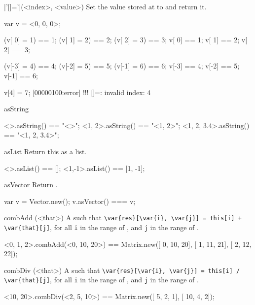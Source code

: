 \begin{urbiscriptapi}
\item|'[]='|(<index>, <value>)%
  Set the value stored at  to  and return it.
\begin{urbiassert}
var v = <0, 0, 0>;

(v[ 0] = 1) == 1; (v[ 1] = 2) == 2; (v[ 2] = 3) == 3;
 v[ 0]      == 1;  v[ 1]      == 2;  v[ 2]      == 3;

(v[-3] = 4) == 4; (v[-2] = 5) == 5; (v[-1] = 6) == 6;
 v[-3]      == 4;  v[-2]      == 5;  v[-1]      == 6;

v[4] = 7;
[00000100:error] !!! []=: invalid index: 4
\end{urbiassert}


\item[asString]%
\begin{urbiassert}
  <>.asString() == "<>";
  <1, 2>.asString() == "<1, 2>";
  <1, 2, 3.4>.asString() == "<1, 2, 3.4>";

\end{urbiassert}

\item[asList]%
  Return this as a list.
\begin{urbiassert}
  <>.asList() == [];
  <1,-1>.asList() == [1, -1];
\end{urbiassert}

\item[asVector]%
  Return \this.
\begin{urbiassert}
var v = Vector.new();
v.asVector() === v;
\end{urbiassert}


\item[combAdd](<that>)%
  A   such that
  \lstinline|\var{res}[\var{i}, \var{j}] = this[i] + \var{that}[j]|, for all
  \lstinline|i| in the range of \this, and \lstinline|j| in the range of
  \that.
\begin{urbiassert}
<0, 1, 2>.combAdd(<0, 10, 20>)
  == Matrix.new([ 0, 10, 20],
                [ 1, 11, 21],
                [ 2, 12, 22]);
\end{urbiassert}


\item[combDiv](<that>)%
  A   such that
  \lstinline|\var{res}[\var{i}, \var{j}] = this[i] / \var{that}[j]|, for all
  \lstinline|i| in the range of \this, and \lstinline|j| in the range of
  \that.
\begin{urbiassert}
<10, 20>.combDiv(<2, 5, 10>)
  == Matrix.new([  5, 2, 1],
                [ 10, 4, 2]);
\end{urbiassert}



\end{urbiscriptapi}
